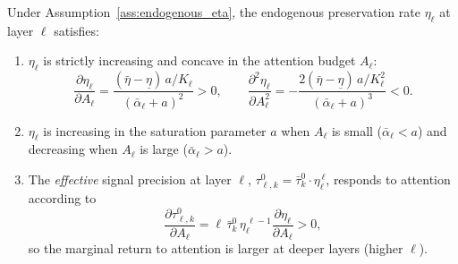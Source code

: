 \begin{proposition}\label{prop:attention_preservation}
Under Assumption~\ref{ass:endogenous_eta}, the endogenous preservation rate $\eta_\ell$ at layer $\ell$ satisfies:
\begin{enumerate}[label=(\roman*)]
\item $\eta_\ell$ is strictly increasing and concave in the attention budget $A_\ell$:
\begin{equation}\label{eq:eta_single_comp}
\frac{\partial \eta_\ell}{\partial A_\ell} = \frac{(\bar{\eta} - \underline{\eta}) \, a / K_\ell}{(\bar{\alpha}_\ell + a)^2} > 0, \qquad \frac{\partial^2 \eta_\ell}{\partial A_\ell^2} = -\frac{2(\bar{\eta} - \underline{\eta}) \, a / K_\ell^2}{(\bar{\alpha}_\ell + a)^3} < 0.
\end{equation}
\item $\eta_\ell$ is increasing in the saturation parameter $a$ when $A_\ell$ is small ($\bar{\alpha}_\ell < a$) and decreasing when $A_\ell$ is large ($\bar{\alpha}_\ell > a$).
\item The \emph{effective} signal precision at layer $\ell$, $\tau^0_{\ell,k} = \bar{\tau}^0_k \cdot \eta_\ell^{\,\ell}$, responds to attention according to
\begin{equation}\label{eq:tau0_attention_elasticity}
\frac{\partial \tau^0_{\ell,k}}{\partial A_\ell} = \ell \, \bar{\tau}^0_k \, \eta_\ell^{\,\ell-1} \frac{\partial \eta_\ell}{\partial A_\ell} > 0,
\end{equation}
so the marginal return to attention is larger at deeper layers (higher $\ell$).
\end{enumerate}
\end{proposition}

